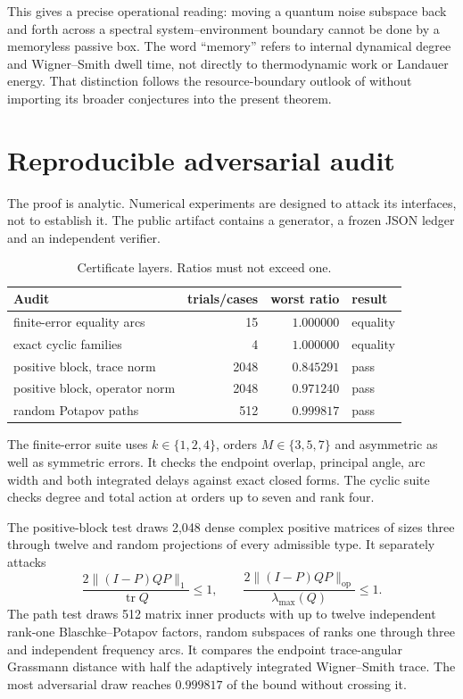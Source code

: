 \documentclass[11pt]{article}
\theoremstyle{definition}
\theoremstyle{remark}
\newcommand{\tr}{\operatorname{tr}}
\begin{document}
This gives a precise operational reading: moving a quantum noise subspace
back and forth across a spectral system--environment boundary cannot be done
by a memoryless passive box.  The word ``memory'' refers to internal dynamical
degree and Wigner--Smith dwell time, not directly to thermodynamic work or
Landauer energy.  That distinction follows the resource-boundary outlook of
\cite{ErikssonCut2026} without importing its broader conjectures into the
present theorem.

\section{Reproducible adversarial audit}

The proof is analytic.  Numerical experiments are designed to attack its
interfaces, not to establish it.  The public artifact contains a generator,
a frozen JSON ledger and an independent verifier.

\begin{table}[t]
\centering
\caption{Certificate layers.  Ratios must not exceed one.}
\label{tab:audit}
\begin{tabular}{@{}lrrl@{}}
\toprule
Audit & trials/cases & worst ratio & result\\
\midrule
finite-error equality arcs & 15 & $1.000000$ & equality\\
exact cyclic families & 4 & $1.000000$ & equality\\
positive block, trace norm & 2048 & $0.845291$ & pass\\
positive block, operator norm & 2048 & $0.971240$ & pass\\
random Potapov paths & 512 & $0.999817$ & pass\\
\bottomrule
\end{tabular}
\end{table}

The finite-error suite uses $k\in\{1,2,4\}$, orders
$M\in\{3,5,7\}$ and asymmetric as well as symmetric errors.  It checks the
endpoint overlap, principal angle, arc width and both integrated delays
against exact closed forms.  The cyclic suite checks degree and total action
at orders up to seven and rank four.

The positive-block test draws 2,048 dense complex positive matrices of sizes
three through twelve and random projections of every admissible type.  It
separately attacks
\[
 \frac{2\|(I-P)QP\|_1}{\tr Q}\leq1,
 \qquad
 \frac{2\|(I-P)QP\|_{\mathrm{op}}}{\lambda_{\max}(Q)}\leq1.
\]
The path test draws 512 matrix inner products with up to twelve independent
rank-one Blaschke--Potapov factors, random subspaces of ranks one through
three and independent frequency arcs.  It compares the endpoint
trace-angular Grassmann distance with half the adaptively integrated
Wigner--Smith trace.  The most adversarial draw reaches $0.999817$ of the
bound without crossing it.
\end{document}
